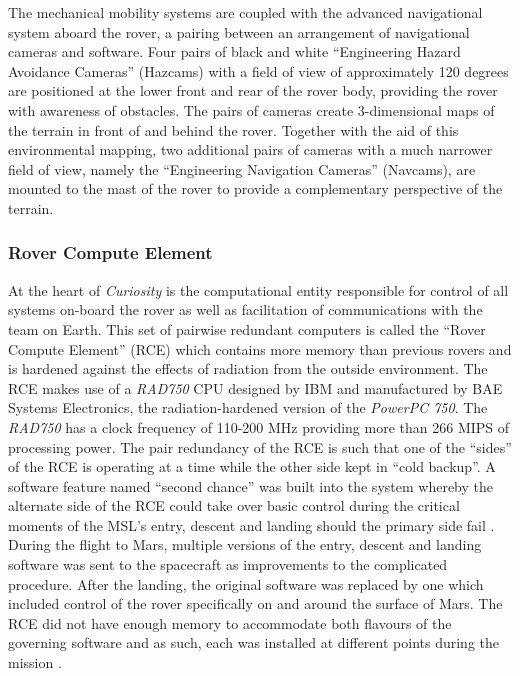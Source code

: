         The mechanical mobility systems are coupled with the advanced navigational system aboard the rover, a pairing between an arrangement of navigational cameras and software. Four pairs of black and white ``Engineering Hazard Avoidance Cameras'' (Hazcams) with a field of view of approximately 120 degrees are positioned at the lower front and rear of the rover body, providing the rover with awareness of obstacles. The pairs of cameras create 3-dimensional maps of the terrain in front of and behind the rover. Together with the aid of this environmental mapping, two additional pairs of cameras with a much narrower field of view, namely the ``Engineering Navigation Cameras'' (Navcams), are mounted to the mast of the rover to provide a complementary perspective of the terrain.
             
      \subsubsection{Rover Compute Element}
        At the heart of \textit{Curiosity} is the computational entity responsible for control of all systems on-board the rover as well as facilitation of communications with the team on Earth. This set of pairwise redundant computers is called the ``Rover Compute Element'' (RCE) which contains more memory than previous rovers and is hardened against the effects of radiation from the outside environment. The RCE makes use of a \textit{RAD750} CPU designed by IBM and manufactured by BAE Systems Electronics, the radiation-hardened version of the \textit{PowerPC 750}. The \textit{RAD750} has a clock frequency of 110-200 MHz providing more than 266 MIPS of processing power. The pair redundancy of the RCE is such that one of the ``sides'' of the RCE is operating at a time while the other side kept in ``cold backup''. A software feature named ``second chance'' was built into the system whereby the alternate side of the RCE could take over basic control during the critical moments of the MSL's entry, descent and landing should the primary side fail \cite{nasajulypresskit}. During the flight to Mars, multiple versions of the entry, descent and landing software was sent to the spacecraft as improvements to the complicated procedure. After the landing, the original software was replaced by one which included control of the rover specifically on and around the surface of Mars. The RCE did not have enough memory to accommodate both flavours of the governing software and as such, each was installed at different points during the mission \cite{cnn2012milesoff}.
        
